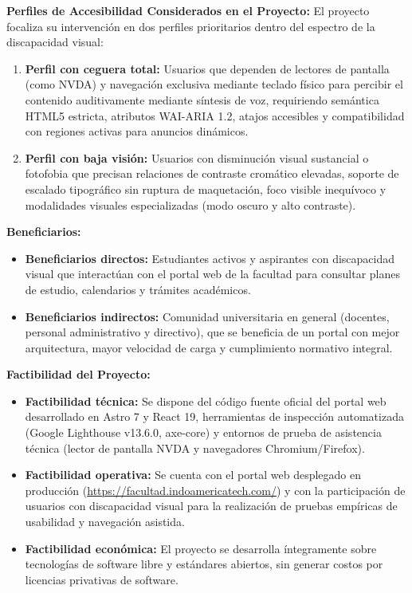 \textbf{Perfiles de Accesibilidad Considerados en el Proyecto:}
El proyecto focaliza su intervención en dos perfiles prioritarios dentro del espectro de la discapacidad visual:
\begin{enumerate}
  \item \textbf{Perfil con ceguera total:} Usuarios que dependen de lectores de pantalla (como NVDA) y navegación exclusiva mediante teclado físico para percibir el contenido auditivamente mediante síntesis de voz, requiriendo semántica HTML5 estricta, atributos WAI-ARIA 1.2, atajos accesibles y compatibilidad con regiones activas para anuncios dinámicos.
  \item \textbf{Perfil con baja visión:} Usuarios con disminución visual sustancial o fotofobia que precisan relaciones de contraste cromático elevadas, soporte de escalado tipográfico sin ruptura de maquetación, foco visible inequívoco y modalidades visuales especializadas (modo oscuro y alto contraste).
\end{enumerate}

\textbf{Beneficiarios:}
\begin{itemize}
  \item \textbf{Beneficiarios directos:} Estudiantes activos y aspirantes con discapacidad visual que interactúan con el portal web de la facultad para consultar planes de estudio, calendarios y trámites académicos.
  \item \textbf{Beneficiarios indirectos:} Comunidad universitaria en general (docentes, personal administrativo y directivo), que se beneficia de un portal con mejor arquitectura, mayor velocidad de carga y cumplimiento normativo integral.
\end{itemize}

\textbf{Factibilidad del Proyecto:}
\begin{itemize}
  \item \textbf{Factibilidad técnica:} Se dispone del código fuente oficial del portal web desarrollado en Astro 7 y React 19, herramientas de inspección automatizada (Google Lighthouse v13.6.0, axe-core) y entornos de prueba de asistencia técnica (lector de pantalla NVDA y navegadores Chromium/Firefox).
  \item \textbf{Factibilidad operativa:} Se cuenta con el portal web desplegado en producción (\url{https://facultad.indoamericatech.com/}) y con la participación de usuarios con discapacidad visual para la realización de pruebas empíricas de usabilidad y navegación asistida.
  \item \textbf{Factibilidad económica:} El proyecto se desarrolla íntegramente sobre tecnologías de software libre y estándares abiertos, sin generar costos por licencias privativas de software.
\end{itemize}

